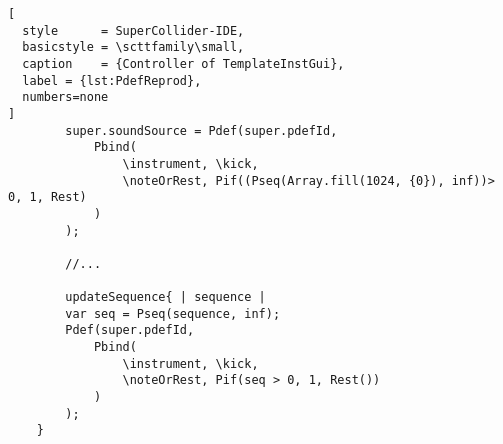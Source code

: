 \documentclass[main.tex]{subfiles}
\begin{document}
\begin{lstlisting}[
  style      = SuperCollider-IDE,
  basicstyle = \scttfamily\small,
  caption    = {Controller of TemplateInstGui},
  label = {lst:PdefReprod},
  numbers=none
]
		super.soundSource = Pdef(super.pdefId,
			Pbind(
				\instrument, \kick,
				\noteOrRest, Pif((Pseq(Array.fill(1024, {0}), inf))> 0, 1, Rest)
			)
		);

		//...

		updateSequence{ | sequence |
		var seq = Pseq(sequence, inf);
		Pdef(super.pdefId,
			Pbind(
				\instrument, \kick,
				\noteOrRest, Pif(seq > 0, 1, Rest())
			)
		);
	}

\end{lstlisting}
\end{document}
